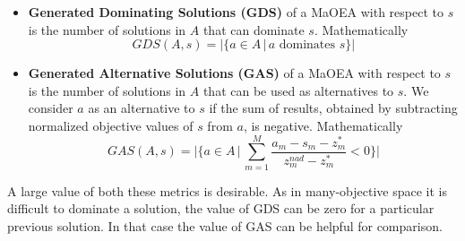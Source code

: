 \begin{itemize}
	\item \textbf{Generated Dominating Solutions (GDS)} of a MaOEA with respect to $s$ is the number of solutions in $A$ that can dominate $s$. Mathematically 
	\begin{equation}
	GDS(A,s) = |\{a \in A \, | \, a \text{ dominates } s\}|
	\label{eq:gds}
	\end{equation}

	\item \textbf{Generated Alternative Solutions (GAS)} of a MaOEA with respect to $s$ is the number of solutions in $A$ that can be used as alternatives to $s$. We consider $a$ as an alternative to $s$ if the sum of results, obtained by subtracting normalized objective values of $s$ from $a$, is negative. Mathematically 
	\begin{equation}
	GAS(A,s) = |\{a \in A \, | \, \sum_{m=1}^{M}\frac{a_m - s_m - z_m^{*}}{z_m^{nad} - z_m^{*}} < 0  \}|
	\label{eq:gas}
	\end{equation}
\end{itemize}

A large value of both these metrics is desirable. As in many-objective space it is difficult to dominate a solution, the value of GDS can be zero for a particular previous solution. In that case the value of GAS can be helpful for comparison.     
%
%

